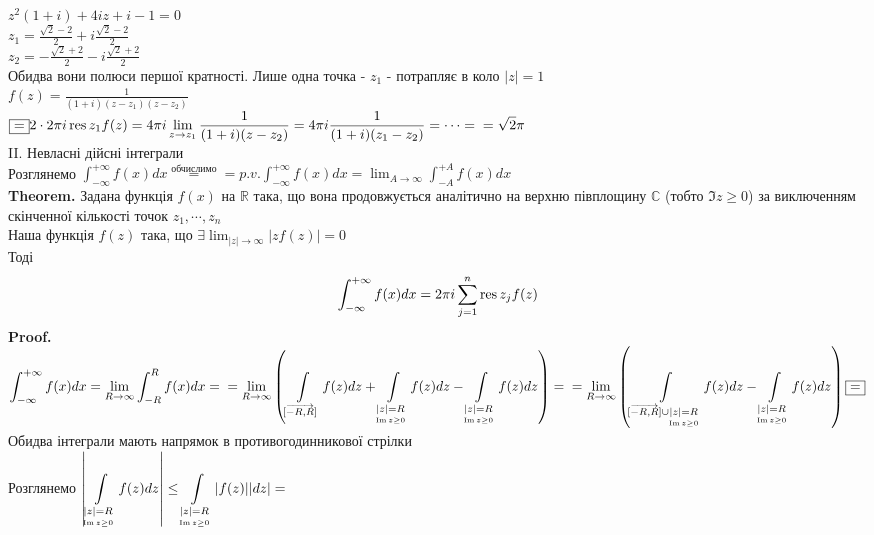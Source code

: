 \documentclass{math_library}
\begin{document}
$z^2(1+i)+4iz+i-1=0$\\
$z_1 = \displaystyle \frac{\sqrt{2}-2}{2} + i \frac{\sqrt{2}-2}{2}$\\
$z_2 = \displaystyle -\frac{\sqrt{2}+2}{2} - i \frac{\sqrt{2}+2}{2}$\\
Обидва вони полюси першої кратності. Лише одна точка - $z_1$ - потрапляє в коло $|z| =1$\\
$\displaystyle f(z) = \frac{1}{(1+i)(z-z_1)(z-z_2)}$\\
$\displaystyle \boxed{=} 2 \cdot 2\pi i \operatorname*{res}{z_1}{f(z)} = 4 \pi i \lim_{z \to z_1} \frac{1}{(1+i)(z-z_2)} = 4 \pi i \frac{1}{(1+i)(z_1 - z_2)} = \dots = \\ = \sqrt{2} \pi$
\bigskip \\

II. Невласні дійсні інтеграли\\
Розглянемо $\displaystyle \int_{-\infty}^{+\infty} f(x) dx \overset{\textrm{обчислимо}}{=} = p.v. \int_{-\infty}^{+\infty} f(x) dx = \lim_{A \to \infty} \int_{-A}^{+A} f(x) dx$
\bigskip \\
\textbf{Theorem.} Задана функція $f(x)$ на $\mathbb{R}$ така, що вона продовжується аналітично на верхню півплощину $\mathbb{C}$ (тобто $\Im z \geq 0$) за виключенням скінченної кількості точок $z_1, \cdots, z_n$\\
Наша функція $f(z)$ така, що $\displaystyle \exists \lim_{|z| \to \infty} |z f(z)| = 0$\\
Тоді \begin{align*}
\int_{-\infty}^{+\infty} f(x) dx = 2 \pi i \sum_{j=1}^n \operatorname*{res}{z_j}{f(z)}
\end{align*}
\textbf{Proof.}\\
$\displaystyle \int_{-\infty}^{+\infty} f(x) dx = \displaystyle \lim_{R \to \infty} \int_{-R}^{R} f(x) dx = \\
= \lim_{R \to \infty} \left(\int\displaylimits_{[\overrightarrow{-R,R}]} f(z)dz + \int\displaylimits_{\underset{\Im z \geq 0}{|z|=R}} f(z)dz - \int\displaylimits_{ \underset{\Im z \geq 0}{|z|=R}} f(z)dz \right) = \\ =
\lim_{R \to \infty} \left(\int\displaylimits_{[\overrightarrow{-R,R}] \cup \underset{\Im z \geq 0}{|z|=R}} f(z)dz - \int\displaylimits_{ \underset{\Im z \geq 0}{|z|=R}} f(z)dz \right) \boxed{=}
$\\
Обидва інтеграли мають напрямок в противогодинникової стрілки\\
Розглянемо $\displaystyle \abs{\int\displaylimits_{ \underset{\Im z \geq 0}{|z|=R}} f(z)dz} \leq \int\displaylimits_{ \underset{\Im z \geq 0}{|z|=R}} \abs{f(z)}\abs{dz} = $\\
\end{document}
